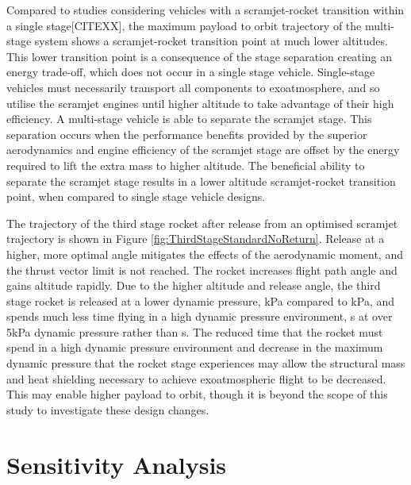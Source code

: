 Compared to studies considering vehicles with a scramjet-rocket transition within a single stage\cite{Lu1993,Trefny1999}[CITEXX], the maximum payload to orbit trajectory of the multi-stage system shows a scramjet-rocket transition point at much lower altitudes.
This lower transition point is a consequence of the stage separation creating an energy trade-off, which does not occur in a single stage vehicle. Single-stage vehicles must necessarily transport all components to exoatmosphere, and so utilise the scramjet engines until higher altitude to take advantage of their high efficiency. A multi-stage vehicle is able to separate the scramjet stage. 
This separation occurs when the performance benefits provided by the superior aerodynamics and engine efficiency of the scramjet stage are offset by the energy required to lift the extra mass to higher altitude. The beneficial ability
to separate the scramjet stage results in a lower altitude scramjet-rocket transition point, when compared to single
stage vehicle designs.






The trajectory of the third stage rocket after release from an optimised scramjet trajectory is shown in Figure \ref{fig:ThirdStageStandardNoReturn}. Release at a higher, more optimal angle mitigates the effects of the aerodynamic moment, and the thrust vector limit is not reached. The rocket increases flight path angle and gains altitude rapidly.
Due to the higher altitude and release angle, the third stage rocket is released at a lower dynamic pressure, \secondthirdSeparationqCdStandardNoReturn kPa compared to \secondthirdSeparationqConstq kPa, and spends much less time flying in a high dynamic pressure environment, \thirdqOverFiveStandard s at over 5kPa dynamic pressure rather than \thirdqOverFiveConstq s. 
The reduced time that the rocket must spend in a high dynamic pressure environment and decrease in the maximum dynamic pressure that the rocket stage experiences may allow the structural mass and heat shielding necessary to achieve exoatmospheric flight to be decreased. This may enable higher payload to orbit, though it is beyond the scope of this study to investigate these design changes. 

\section{Sensitivity Analysis}

